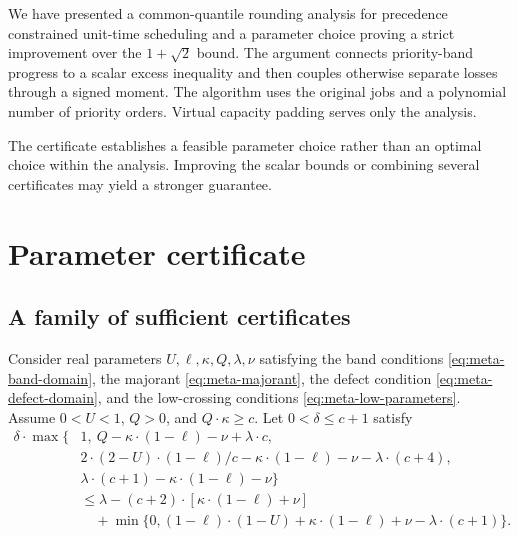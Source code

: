 We have presented a common-quantile rounding analysis for precedence
constrained unit-time scheduling and a parameter choice proving
a strict improvement over the $1+\sqrt2$ bound. The argument connects
priority-band progress to a scalar excess inequality and then couples
otherwise separate losses through a signed moment. The algorithm uses
the original jobs and a polynomial number of priority orders. Virtual capacity padding serves only the analysis.

The certificate establishes a feasible parameter choice rather than an
optimal choice within the analysis. Improving the scalar bounds or combining
several certificates may yield a stronger guarantee.

\appendix
\section{Parameter certificate}
\label{sec:meta-parameters}

\subsection{A family of sufficient certificates}

Consider real parameters $U,\ell,\kappa,Q,\lambda,\nu$ satisfying the band
conditions \eqref{eq:meta-band-domain}, the majorant
\eqref{eq:meta-majorant}, the defect condition
\eqref{eq:meta-defect-domain}, and the low-crossing conditions
\eqref{eq:meta-low-parameters}. Assume $0<U<1$, $Q>0$, and
$Q\cdot\kappa\ge c$.
Let $0<\delta\le c+1$ satisfy
\begin{equation}
\begin{aligned}
 \delta\cdot\max\bigl\{&1,\ Q-\kappa\cdot(1-\ell)-\nu+\lambda\cdot c,\\
 &2\cdot(2-U)\cdot(1-\ell)/c-\kappa\cdot(1-\ell)-\nu-\lambda\cdot(c+4),\\
 &\lambda\cdot(c+1)-\kappa\cdot(1-\ell)-\nu\bigr\}\\
 &\le\lambda-(c+2)\cdot[\kappa\cdot(1-\ell)+\nu]\\
 &\quad+\min\{0,(1-\ell)\cdot(1-U)+\kappa\cdot(1-\ell)+\nu-\lambda\cdot(c+1)\}.
\end{aligned}
\label{eq:general-certificate}
\end{equation}

